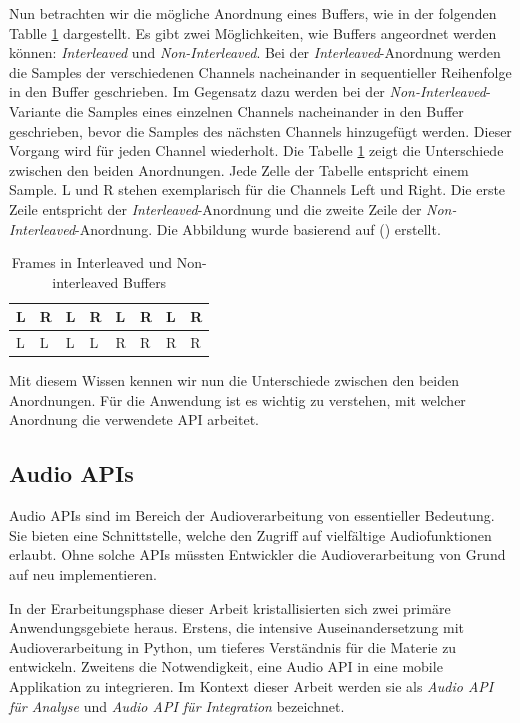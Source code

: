 \documentclass[11pt,a4paper]{article}
\begin{document}
\noindent \newline
Nun betrachten wir die mögliche Anordnung eines Buffers, wie in der folgenden Tablle 
\ref{tab:frames_buffers} dargestellt. Es gibt zwei Möglichkeiten, wie Buffers angeordnet werden
können: \textit{Interleaved} und \textit{Non-Interleaved}. Bei der \textit{Interleaved}-Anordnung
werden die Samples der verschiedenen Channels nacheinander in sequentieller Reihenfolge in den Buffer
geschrieben. Im Gegensatz dazu werden bei der \textit{Non-Interleaved}-Variante die Samples
eines einzelnen Channels nacheinander in den Buffer geschrieben, bevor die Samples des nächsten Channels
hinzugefügt werden. Dieser Vorgang wird für jeden Channel wiederholt. Die Tabelle
\ref{tab:frames_buffers} zeigt die Unterschiede zwischen den beiden Anordnungen. Jede Zelle der
Tabelle entspricht einem Sample. L und R stehen exemplarisch für die Channels Left und Right.
Die erste Zeile entspricht der \textit{Interleaved}-Anordnung und die zweite Zeile der
\textit{Non-Interleaved}-Anordnung. Die Abbildung wurde basierend auf
(\cite[p.11]{somberg2019audioapi}) erstellt.

\begin{table}[h]
	\centering
	\begin{tabularx}{\textwidth}{|X|X|X|X|X|X|X|X|}
		\hline
		L & R & L & R & L & R & L & R \\
		\hline
		L & L & L & L & R & R & R & R \\
		\hline
	\end{tabularx}
	\caption{Frames in Interleaved und Non-interleaved Buffers}
	\label{tab:frames_buffers}
\end{table}

\noindent
Mit diesem Wissen kennen wir nun die Unterschiede zwischen den beiden Anordnungen. Für die
Anwendung ist es wichtig zu verstehen, mit welcher Anordnung die verwendete API arbeitet.

\subsection{Audio APIs}
Audio APIs sind im Bereich der Audioverarbeitung von essentieller Bedeutung. Sie bieten eine
Schnittstelle, welche den Zugriff auf vielfältige Audiofunktionen erlaubt. Ohne solche APIs müssten
Entwickler die Audioverarbeitung von Grund auf neu implementieren.

\noindent \newline
In der Erarbeitungsphase dieser Arbeit kristallisierten sich zwei primäre Anwendungsgebiete heraus.
Erstens, die intensive Auseinandersetzung mit Audioverarbeitung in Python, um tieferes Verständnis
für die Materie zu entwickeln. Zweitens die Notwendigkeit, eine Audio API in eine mobile
Applikation zu integrieren. Im Kontext dieser Arbeit werden sie als \textit{Audio API für Analyse}
und \textit{Audio API für Integration} bezeichnet.
\end{document}
